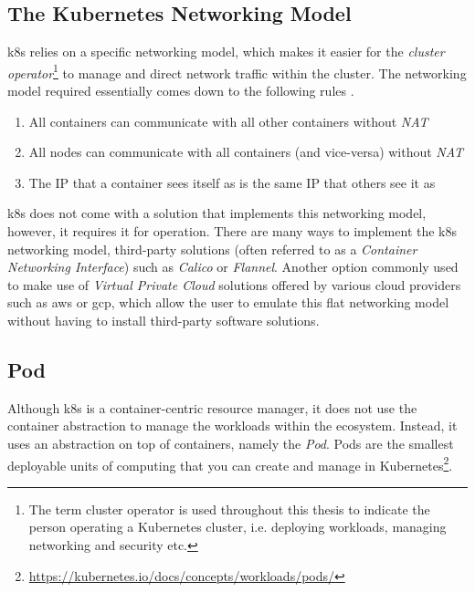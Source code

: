 \subsection{The Kubernetes Networking Model}
\label{sec:background:kubernetes:networking-model}

\Gls{k8s} relies on a specific networking model, which makes it easier for the \textit{cluster operator}\footnote{The term cluster operator is used throughout this thesis to indicate the person operating a Kubernetes cluster, i.e. deploying workloads, managing networking and security etc.} to manage and direct network traffic within the cluster. The networking model required essentially comes down to the following rules \cite{container-networking-from-scratch}.

\begin{enumerate}
  \item All containers can communicate with all other containers without \textit{NAT}
  \item All nodes can communicate with all containers (and vice-versa) without \textit{NAT}
  \item The IP that a container sees itself as is the same IP that others see it as
\end{enumerate}

\Gls{k8s} does not come with a solution that implements this networking model, however, it requires it for operation. There are many ways to implement the \gls{k8s} networking model, third-party solutions (often referred to as a \textit{Container Networking Interface}) such as \textit{Calico} or \textit{Flannel}. Another option commonly used to make use of \textit{Virtual Private Cloud} solutions offered by various cloud providers such as \gls{aws} or \gls{gcp}, which allow the user to emulate this flat networking model without having to install third-party software solutions.

\subsection{Pod}
\label{sec:background:kubernetes:pod}

Although \gls{k8s} is a container-centric resource manager, it does not use the container abstraction to manage the workloads within the ecosystem. Instead, it uses an abstraction on top of containers, namely the \textit{Pod}. Pods are the smallest deployable units of computing that you can create and manage in Kubernetes\footnote{\url{https://kubernetes.io/docs/concepts/workloads/pods/}}. 

